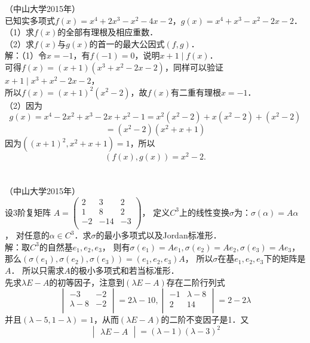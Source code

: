 \documentclass{article}
\begin{document}
\noindent （中山大学2015年）
\\ 已知实多项式$f(x)=x^4+2x^3-x^2-4x-2$，$g(x)=x^4+x^3-x^2-2x-2$．
\\ （1）求$f(x)$的全部有理根及相应重数．
\\ （2）求$f(x)$与$g(x)$的首一的最大公因式$(f,g)$．
\\ 解：（1）令$x=-1$，有$f(-1)=0$，说明$x+1\mid f(x)$．
\\ 可得$f(x)=(x+1)(x^3+x^2-2x-2)$，同样可以验证$x+1\mid x^3+x^2-2x-2$，
\\ 所以$f(x)=(x+1)^2(x^2-2)$，故$f(x)$有二重有理根$x=-1$．
\\ （2）因为
$$g(x)=x^4-2x^2+x^3-2x+x^2-1=x^2(x^2-2)+x(x^2-2)+(x^2-2)$$
$$=(x^2-2)(x^2+x+1)$$
因为$((x+1)^2,x^2+x+1)=1$，所以
$$(f(x),g(x))=x^2-2.$$
\\ \\ （中山大学2015年）
\\ 设3阶复矩阵
$A=
    \left(
    \begin{matrix}
            2  & 3   & 2  \\
            1  & 8   & 2  \\
            -2 & -14 & -3 \\
        \end{matrix}
    \right)$，
定义$C^3$上的线性变换$\sigma$为：$\sigma(\alpha)=A\alpha$，
对任意的$\alpha\in C^3$．求$\sigma$的最小多项式以及Jordan标准形．
\\ 解：取$C^3$的自然基$e_1,e_2,e_3$，
则有$\sigma(e_1)=Ae_1,\sigma(e_2)=Ae_2,\sigma(e_3)=Ae_3$，
那么$(\sigma(e_1),\sigma(e_2),\sigma(e_3))=(e_1,e_2,e_3)A$，
所以$\sigma$在基$e_1,e_2,e_3$下的矩阵是$A$．
所以只需求$A$的极小多项式和若当标准形．
\\ 先求$\lambda E-A$的初等因子，注意到$(\lambda E-A)$存在二阶行列式
$$
    \begin{vmatrix}
        -3        & -2 \\
        \lambda-8 & -2 \\
    \end{vmatrix}
    =2\lambda-10,
    \begin{vmatrix}
        -1 & \lambda-8 \\
        2  & 14        \\
    \end{vmatrix}
    =2-2\lambda
$$
并且$(\lambda-5,1-\lambda)=1$，从而$(\lambda E-A)$的二阶不变因子是1．又
$$\begin{vmatrix}\lambda E-A\end{vmatrix}=(\lambda-1)(\lambda-3)^2$$
\end{document}
